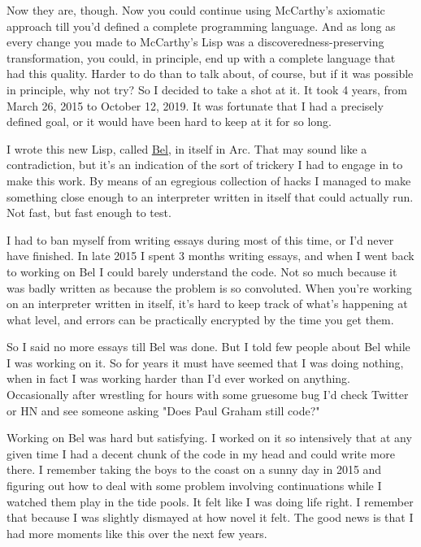 Now
                  they are, though. Now you could continue using McCarthy's
                  axiomatic approach till you'd defined a complete programming
                  language. And as long as every change you made to McCarthy's
                  Lisp was a discoveredness-preserving transformation, you
                  could, in principle, end up with a complete language that had
                  this quality. Harder to do than to talk about, of course, but
                  if it was possible in principle, why not try? So I decided to
                  take a shot at it. It took 4 years, from March 26, 2015 to
                  October 12, 2019. It was fortunate that I had a precisely
                  defined goal, or it would have been hard to keep at it for so
                  long.

I wrote this new Lisp, called
                  \href{http://www.paulgraham.com/bel.html}{\underline{Bel}}, in itself in Arc. That may sound like a contradiction, but
                  it's an indication of the sort of trickery I had to engage in
                  to make this work. By means of an egregious collection of
                  hacks I managed to make something close enough to an
                  interpreter written in itself that could actually run. Not
                  fast, but fast enough to test.

I had to ban myself
                  from writing essays during most of this time, or I'd never
                  have finished. In late 2015 I spent 3 months writing essays,
                  and when I went back to working on Bel I could barely
                  understand the code. Not so much because it was badly written
                  as because the problem is so convoluted. When you're working
                  on an interpreter written in itself, it's hard to keep track
                  of what's happening at what level, and errors can be
                  practically encrypted by the time you get them.

So
                  I said no more essays till Bel was done. But I told few people
                  about Bel while I was working on it. So for years it must have
                  seemed that I was doing nothing, when in fact I was working
                  harder than I'd ever worked on anything. Occasionally after
                  wrestling for hours with some gruesome bug I'd check Twitter
                  or HN and see someone asking "Does Paul Graham still code?"

Working
                  on Bel was hard but satisfying. I worked on it so intensively
                  that at any given time I had a decent chunk of the code in my
                  head and could write more there. I remember taking the boys to
                  the coast on a sunny day in 2015 and figuring out how to deal
                  with some problem involving continuations while I watched them
                  play in the tide pools. It felt like I was doing life right. I
                  remember that because I was slightly dismayed at how novel it
                  felt. The good news is that I had more moments like this over
                  the next few years.

